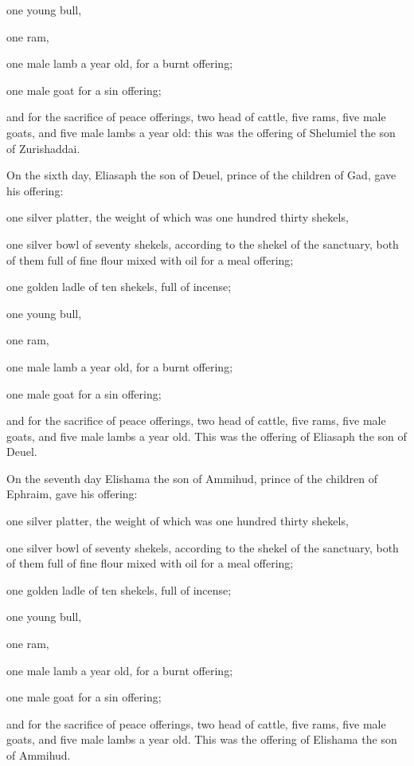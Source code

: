  one young bull,

one ram,

one male lamb a year old, for a burnt offering;

 one male goat for a sin offering;

 and for the sacrifice of peace offerings, two head of
cattle, five rams, five male goats, and five male lambs a year old: this
was the offering of Shelumiel the son of Zurishaddai.

 On the sixth day, Eliasaph the son of Deuel, prince of
the children of Gad,  gave his offering:

one silver platter, the weight of which was one hundred thirty shekels,

one silver bowl of seventy shekels, according to the shekel of the
sanctuary, both of them full of fine flour mixed with oil for a meal
offering;

 one golden ladle of ten shekels, full of incense;

 one young bull,

one ram,

one male lamb a year old, for a burnt offering;

 one male goat for a sin offering;

 and for the sacrifice of peace offerings, two head of
cattle, five rams, five male goats, and five male lambs a year old. This
was the offering of Eliasaph the son of Deuel.

 On the seventh day Elishama the son of Ammihud, prince
of the children of Ephraim,  gave his offering:

one silver platter, the weight of which was one hundred thirty shekels,

one silver bowl of seventy shekels, according to the shekel of the
sanctuary, both of them full of fine flour mixed with oil for a meal
offering;

 one golden ladle of ten shekels, full of incense;

 one young bull,

one ram,

one male lamb a year old, for a burnt offering;

 one male goat for a sin offering;

 and for the sacrifice of peace offerings, two head of
cattle, five rams, five male goats, and five male lambs a year old. This
was the offering of Elishama the son of Ammihud.


